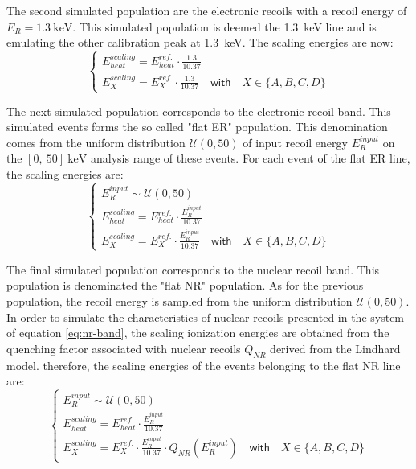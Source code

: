The second simulated population are the electronic recoils with a recoil energy of $E_R = \SI{1.3}{\kilo\eV}$.  This simulated population is deemed the \SI{1.3}{\kilo\eV} line and is emulating the other calibration peak at \SI{1.3}{\kilo\eV}. The scaling energies are now:
\begin{equation}
\begin{cases}
\displaystyle
E_{heat}^{scaling} = E_{heat}^{ref.} \cdot \frac{1.3}{10.37}
\\
\displaystyle
E_{X}^{scaling} = E_{X}^{ref.} \cdot \frac{1.3}{10.37} \quad \textsf{with} \quad X \in \{A,B,C,D\}
\end{cases}
\end{equation}

The next simulated population corresponds to the electronic recoil band. This simulated events forms the so called "flat ER" population. This denomination comes from the uniform distribution $\mathcal{U}(0,50)$ of input recoil energy $E_R^{input}$ on the $[0,\ 50]\ \si{\kilo\eV}$ analysis range of these events.
For each event of the flat ER line, the scaling energies are:
\begin{equation}
\begin{cases}
\displaystyle
E_R^{input} \sim \mathcal{U}(0,50)
\\
\displaystyle
E_{heat}^{scaling} = E_{heat}^{ref.} \cdot \frac{E_R^{input}}{10.37}
\\
\displaystyle
E_{X}^{scaling} = E_{X}^{ref.} \cdot \frac{E_R^{input}}{10.37} \quad \textsf{with} \quad X \in \{A,B,C,D\}
\end{cases}
\end{equation}

The final simulated population corresponds to the nuclear recoil band. This population is denominated the "flat NR" population. As for the previous population, the recoil energy is sampled from the uniform distribution $\mathcal{U}(0,50)$. In order to simulate the characteristics of nuclear recoils presented in the system of equation \ref{eq:nr-band}, the scaling ionization energies are obtained from the quenching factor associated with nuclear recoils $Q_{NR}$ derived from the Lindhard model. therefore, the scaling energies of the events belonging to the flat NR line are:
\begin{equation}
\begin{cases}
\displaystyle 
E_R^{input} \sim \mathcal{U}(0,50)
\\
\displaystyle
E_{heat}^{scaling} = E_{heat}^{ref.} \cdot \frac{E_R^{input}}{10.37}
\\
\displaystyle
E_{X}^{scaling} = E_{X}^{ref.} \cdot \frac{E_R^{input}}{10.37}  \cdot Q_{NR} \left( E_R^{input} \right)
\quad \textsf{with} \quad X \in \{A,B,C,D\}
\end{cases}
\end{equation}

